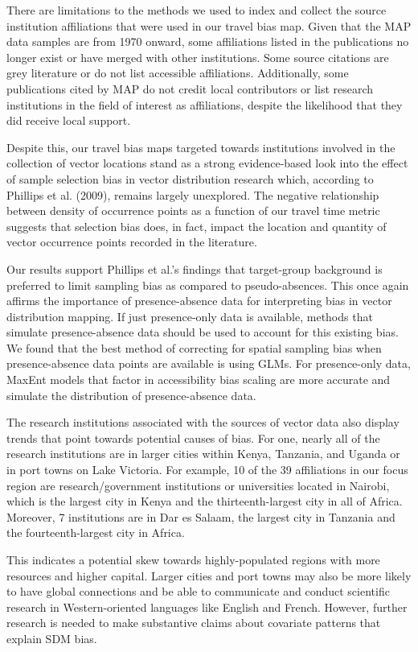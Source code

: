 \documentclass[sn-nature]{sn-jnl}%
\begin{document}
{There are limitations to the methods we used to index and collect the source institution affiliations that were used in our travel bias map. Given that the MAP data samples are from 1970 onward, some affiliations listed in the publications no longer exist or have merged with other institutions. Some source citations are grey literature or do not list accessible affiliations. Additionally, some publications cited by MAP do not credit local contributors or list research institutions in the field of interest as affiliations, despite the likelihood that they did receive local support. 

Despite this, our travel bias maps targeted towards institutions involved in the collection of vector locations stand as a strong evidence-based look into the effect of sample selection bias in vector distribution research which, according to Phillips et al. (2009), remains largely unexplored. The negative relationship between density of occurrence points as a function of our travel time metric suggests that selection bias does, in fact, impact the location and quantity of vector occurrence points recorded in the literature. 

Our results support Phillips et al.’s findings that target-group background is preferred to limit sampling bias as compared to pseudo-absences. This once again affirms the importance of presence-absence data for interpreting bias in vector distribution mapping. If just presence-only data is available, methods that simulate presence-absence data should be used to account for this existing bias. We found that the best method of correcting for spatial sampling bias when presence-absence data points are available is using GLMs. For presence-only data, MaxEnt models that factor in accessibility bias scaling are more accurate and simulate the distribution of presence-absence data. 

The research institutions associated with the sources of vector data also display trends that point towards potential causes of bias. For one, nearly all of the research institutions are in larger cities within Kenya, Tanzania, and Uganda or in port towns on Lake Victoria. For example, 10 of the 39 affiliations in our focus region are research/government institutions or universities located in Nairobi, which is the largest city in Kenya and the thirteenth-largest city in all of Africa. Moreover, 7 institutions are in Dar es Salaam, the largest city in Tanzania and the fourteenth-largest city in Africa. 

This indicates a potential skew towards highly-populated regions with more resources and higher capital. Larger cities and port towns may also be more likely to have global connections and be able to communicate and conduct scientific research in Western-oriented languages like English and French. However, further research is needed to make substantive claims about covariate patterns that explain SDM bias. 

}
\end{document}
